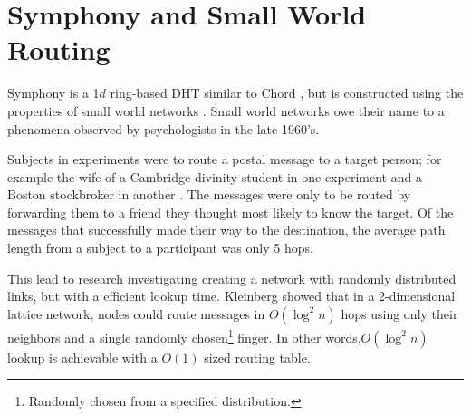 \documentclass[10pt,letterpaper,twoside]{report}
\begin{document}






\section{Symphony and Small World Routing}
Symphony  \cite{symphony} is a 1$d$ ring-based DHT similar to Chord \cite{chord}, but is constructed using the properties of small world networks \cite{kleinberg2000small}.
Small world networks owe their name to a phenomena observed by psychologists in the late 1960's. 

Subjects in experiments were to route a postal message to a target person; for example the wife of a Cambridge divinity student in one experiment and a Boston stockbroker in another \cite{milgram1967small}.
The messages were only to be routed by forwarding them to a friend they thought most likely to know the target.
Of the messages that successfully made their way to the destination, the average path length from a subject to a participant was only 5 hops.  

This lead to research investigating creating a network with randomly distributed links, but with a efficient lookup time.
Kleinberg \cite{kleinberg2000navigation} showed that in a 2-dimensional lattice network, nodes could route messages in $O(\log^{2}n)$ hops using only their neighbors and a single randomly chosen\footnote{Randomly chosen from a specified distribution.} finger.
In other words,$O(\log^{2}n)$ lookup is achievable with a $O(1)$ sized routing table.
\end{document}
